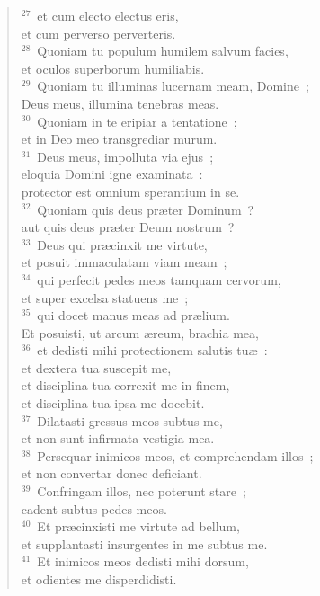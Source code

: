\begin{flushleft}
\begin{verse}
${}^{27}$~et cum electo electus eris,\\ et cum perverso perverteris.\\
${}^{28}$~Quoniam tu populum humilem salvum facies,\\ et oculos superborum humiliabis.\\
${}^{29}$~Quoniam tu illuminas lucernam meam, Domine~;\\ Deus meus, illumina tenebras meas.\\
${}^{30}$~Quoniam in te eripiar a tentatione~;\\ et in Deo meo transgrediar murum.\\
${}^{31}$~Deus meus, impolluta via ejus~;\\ eloquia Domini igne examinata~:\\ protector est omnium sperantium in se.\\
${}^{32}$~Quoniam quis deus pr\ae ter Dominum~?\\ aut quis deus pr\ae ter Deum nostrum~?\\
${}^{33}$~Deus qui pr\ae cinxit me virtute,\\ et posuit immaculatam viam meam~;\\
${}^{34}$~qui perfecit pedes meos tamquam cervorum,\\ et super excelsa statuens me~;\\
${}^{35}$~qui docet manus meas ad pr\ae lium.\\ Et posuisti, ut arcum \ae reum, brachia mea,\\
${}^{36}$~et dedisti mihi protectionem salutis tu\ae~:\\ et dextera tua suscepit me,\\ et disciplina tua correxit me in finem,\\ et disciplina tua ipsa me docebit.\\
${}^{37}$~Dilatasti gressus meos subtus me,\\ et non sunt infirmata vestigia mea.\\
${}^{38}$~Persequar inimicos meos, et comprehendam illos~;\\ et non convertar donec deficiant.\\
${}^{39}$~Confringam illos, nec poterunt stare~;\\ cadent subtus pedes meos.\\
${}^{40}$~Et pr\ae cinxisti me virtute ad bellum,\\ et supplantasti insurgentes in me subtus me.\\
${}^{41}$~Et inimicos meos dedisti mihi dorsum,\\ et odientes me disperdidisti.\\

\end{verse}
\end{flushleft}
